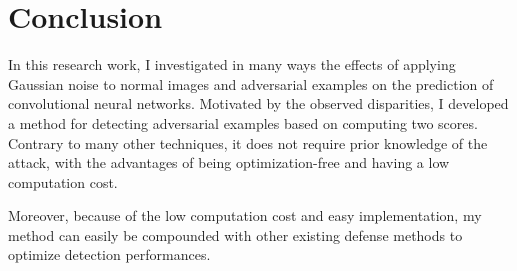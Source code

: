 \chapter{Conclusion}
\label{conclusion}

In this research work, I investigated in many ways the effects of applying
Gaussian noise to normal images and adversarial examples on the prediction of
convolutional neural networks. Motivated by the observed disparities, I
developed a method for detecting adversarial examples based on computing two
scores. Contrary to many other techniques, it does not require prior knowledge
of the attack, with the advantages of being optimization-free and having a low
computation cost.

Moreover, because of the low computation cost and easy implementation, my method
can easily be compounded with other existing defense methods to optimize
detection performances.